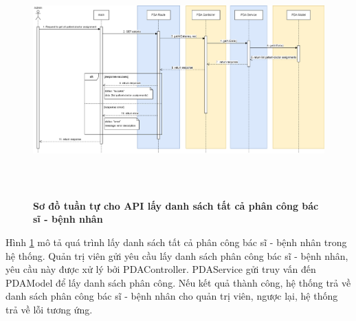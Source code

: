 \begin{figure}[H]
  \centering
  \includegraphics[width=16cm,height=9cm]{Images/sequence_api/getAllPDA.png}
  \caption[Sơ đồ tuần tự cho API lấy danh sách tất cả phân công bác sĩ - bệnh nhân ]{\bfseries \fontsize{12pt}{0pt}
  \selectfont Sơ đồ tuần tự cho API lấy danh sách tất cả phân công bác sĩ - bệnh nhân }
  \label{api_getAllPDA} %
\end{figure}
Hình \ref{api_getAllPDA} mô tả quá trình lấy danh sách tất cả phân công bác sĩ - bệnh nhân trong hệ thống. Quản trị viên gửi yêu cầu lấy danh sách phân công bác sĩ - bệnh nhân, 
yêu cầu này được xử lý bởi PDAController. PDAService gửi truy vấn đến PDAModel để lấy danh sách phân công. Nếu kết quả thành công, hệ thống trả về danh sách phân công bác sĩ - bệnh nhân cho quản trị viên, ngược lại, hệ thống trả về lỗi tương ứng.
